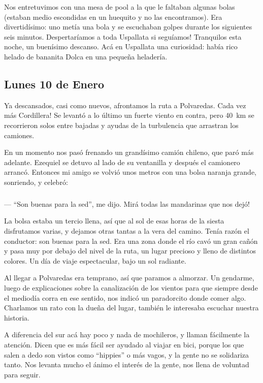Nos entretuvimos con una mesa de pool a la que le faltaban algunas bolas
(estaban medio escondidas en un huequito y no las encontramos). Era
divertid\'isimo: uno met\'ia una bola y se escuchaban golpes durante los
siguientes seis minutos. \textexclamdown Despertar\'iamos a toda Uspallata si
segu\'iamos! Tranquilos esta noche, un buen\'isimo descanso. Ac\'a en Uspallata
una curiosidad: hab\'ia rico helado de bananita Dolca en una peque\~na
helader\'ia.

\subsection*{Lunes 10 de Enero}

Ya descansados, casi como nuevos, afrontamos la ruta a Polvaredas.
\textexclamdown Cada vez m\'as Cordillera! Se levant\'o a lo \'ultimo un fuerte
viento en contra, pero 40~km se recorrieron solos entre bajadas y ayudas de la
turbulencia que arrastran los camiones.

En un momento nos pas\'o frenando un grand\'isimo cami\'on chileno, que par\'o
m\'as adelante. Ezequiel se detuvo al lado de su ventanilla y despu\'es el
camionero arranc\'o. Entonces mi amigo se volvi\'o unos metros con una bolsa
naranja grande, sonriendo, y celebr\'o:

\subparagraph{}\label{ssub:camion} --- ``Son buenas para la sed'', me dijo.
\textexclamdown Mir\'a todas las mandarinas que nos dej\'o!\\ \hangindent=1.6cm

La bolsa estaba un tercio llena, as\'i que al sol de esas horas de la siesta
disfrutamos varias, y dejamos otras tantas a la vera del camino. Ten\'ia raz\'on
el conductor: son buenas para la sed. Era una zona donde el r\'io cav\'o un gran
ca\~n\'on y pasa muy por debajo del nivel de la ruta, un lugar precioso y lleno
de distintos colores. Un d\'ia de viaje espectacular, bajo un sol radiante.

Al llegar a Polvaredas era temprano, as\'i que paramos a almorzar. Un gendarme,
luego de explicaciones sobre la canalizaci\'on de los vientos para que siempre
desde el mediod\'ia corra en ese sentido, nos indic\'o un paradorcito donde
comer algo. Charlamos un rato con la due\~na del lugar, tambi\'en le interesaba
escuchar nuestra historia.

A diferencia del sur ac\'a hay poco y nada de mochileros, y llaman f\'acilmente
la atenci\'on. Dicen que es m\'as f\'acil ser ayudado al viajar en bici, porque
los que salen a dedo son vistos como ``hippies'' o m\'as vagos, y la gente no se
solidariza tanto. Nos levanta mucho el \'animo el inter\'es de la gente, nos
llena de voluntad para seguir.

